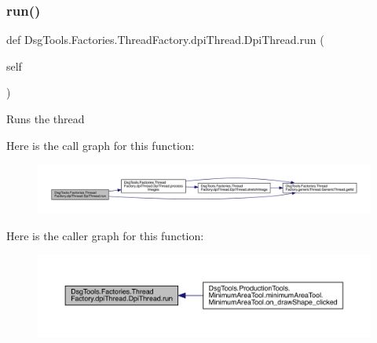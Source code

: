 \subsubsection{\texorpdfstring{run()}{run()}}
{\footnotesize\ttfamily def Dsg\+Tools.\+Factories.\+Thread\+Factory.\+dpi\+Thread.\+Dpi\+Thread.\+run (\begin{DoxyParamCaption}\item[{}]{self }\end{DoxyParamCaption})}

\begin{DoxyVerb}Runs the thread
\end{DoxyVerb}
 Here is the call graph for this function\+:
\nopagebreak
\begin{figure}[H]
\begin{center}
\leavevmode
\includegraphics[width=350pt]{class_dsg_tools_1_1_factories_1_1_thread_factory_1_1dpi_thread_1_1_dpi_thread_a2ef6dd0533f1f3e9b3ffc0e83c2608c0_cgraph}
\end{center}
\end{figure}
Here is the caller graph for this function\+:
\nopagebreak
\begin{figure}[H]
\begin{center}
\leavevmode
\includegraphics[width=350pt]{class_dsg_tools_1_1_factories_1_1_thread_factory_1_1dpi_thread_1_1_dpi_thread_a2ef6dd0533f1f3e9b3ffc0e83c2608c0_icgraph}
\end{center}
\end{figure}
\mbox{\label{class_dsg_tools_1_1_factories_1_1_thread_factory_1_1dpi_thread_1_1_dpi_thread_aa13c7c4b7d34745cedf701a8eee22d10}} 
